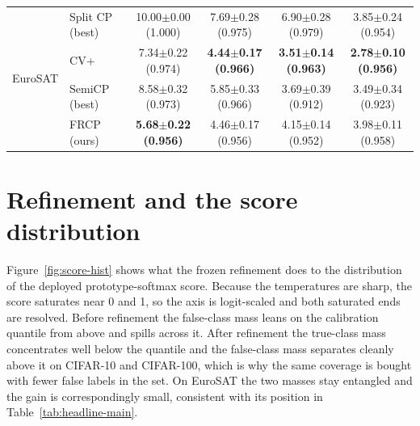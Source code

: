 \begin{table}[t]
\begin{tabular}{llcccc}
\midrule
\multirow{4}{*}{EuroSAT} & Split CP (best) & 10.00$\pm$0.00 {\scriptsize(1.000)} & 7.69$\pm$0.28 {\scriptsize(0.975)} & 6.90$\pm$0.28 {\scriptsize(0.979)} & 3.85$\pm$0.24 {\scriptsize(0.954)}\\
 & CV+ & 7.34$\pm$0.22 {\scriptsize(0.974)} & \textbf{4.44$\pm$0.17 {\scriptsize(0.966)}} & \textbf{3.51$\pm$0.14 {\scriptsize(0.963)}} & \textbf{2.78$\pm$0.10 {\scriptsize(0.956)}}\\
 & SemiCP (best) & 8.58$\pm$0.32 {\scriptsize(0.973)} & 5.85$\pm$0.33 {\scriptsize(0.966)} & 3.69$\pm$0.39 {\scriptsize(0.912)} & 3.49$\pm$0.34 {\scriptsize(0.923)}\\
 & FRCP (ours) & \textbf{5.68$\pm$0.22 {\scriptsize(0.956)}} & 4.46$\pm$0.17 {\scriptsize(0.956)} & 4.15$\pm$0.14 {\scriptsize(0.952)} & 3.98$\pm$0.11 {\scriptsize(0.958)}\\
\bottomrule
\end{tabular}
\end{table}
\section{Refinement and the score distribution}
\label{app:scorehist}

Figure~\ref{fig:score-hist} shows what the frozen refinement does to
the distribution of the deployed prototype-softmax score. Because the
temperatures are sharp, the score saturates near 0 and 1, so
the axis is logit-scaled and both saturated ends are resolved. Before
refinement the false-class mass leans on the calibration quantile from
above and spills across it. After refinement the true-class mass
concentrates well below the quantile and the false-class mass
separates cleanly above it on CIFAR-10 and CIFAR-100, which is why the
same coverage is bought with fewer false labels in the set. On EuroSAT
the two masses stay entangled and the gain is correspondingly small,
consistent with its position in Table~\ref{tab:headline-main}.

